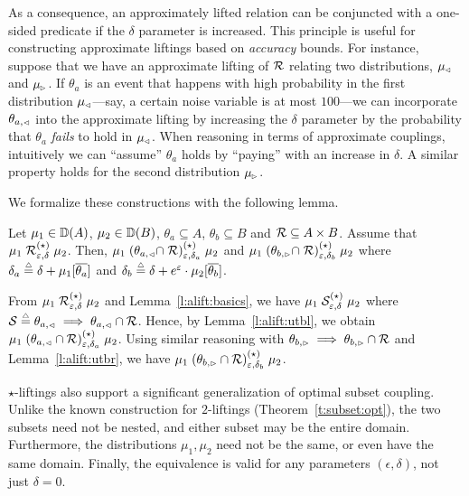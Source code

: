 \documentclass{lmcs}
\begin{document}
As a consequence, an approximately lifted relation can be conjuncted with a
one-sided predicate if the $\delta$ parameter is increased. This principle is
useful for constructing approximate liftings based on \emph{accuracy} bounds.
For instance, suppose that we have an approximate lifting of $\mathcal{R}$ relating two
distributions, $\mu_{\mspace{-1.5mu}{\scriptscriptstyle \vartriangleleft}}$ and $\mu_{\mspace{-1.5mu}{\scriptscriptstyle \vartriangleright}}$. If $\theta_{a}$ is an event that
happens with high probability in the first distribution $\mu_{\mspace{-1.5mu}{\scriptscriptstyle \vartriangleleft}}$---say, a
certain noise variable is at most $100$---we can incorporate $\theta_{a,
{\scriptscriptstyle \vartriangleleft}}$ into the approximate lifting by increasing the $\delta$ parameter by
the probability that $\theta_{a}$ \emph{fails} to hold in $\mu_{\mspace{-1.5mu}{\scriptscriptstyle \vartriangleleft}}$. When
reasoning in terms of approximate couplings, intuitively we can ``assume''
$\theta_{a}$ holds by ``paying'' with an increase in $\delta$. A similar
property holds for the second distribution $\mu_{\mspace{-1.5mu}{\scriptscriptstyle \vartriangleright}}$.

We formalize these constructions with the following lemma.

\begin{lem} \label{l:onesided:and}
  Let $\mu_1 \in {\mathbb{D}}(A)$, $\mu_2 \in {\mathbb{D}}(B)$,
  $\theta_a \subseteq A$, $\theta_b \subseteq B$ and
  $\mathcal{R} \subseteq A \times B$.
  Assume that
  $\mu_1 \mathrel{\mathrel{\mathcal{R}}^{(\star)}_{\varepsilon,\delta}} \mu_2$.
  Then, 
  $\mu_1 \mathrel{(\theta_{a,{\scriptscriptstyle \vartriangleleft}} \cap \mathrel{\mathcal{R}})^{(\star)}_{\varepsilon,\delta_a}} \mu_2$
  and
  $\mu_1 \mathrel{(\theta_{b,{\scriptscriptstyle \vartriangleright}} \cap \mathrel{\mathcal{R}})^{(\star)}_{\varepsilon,\delta_b}} \mu_2$
  where $\delta_a \mathrel{\stackrel{\scriptscriptstyle \triangle}{=}} \delta + \mu_1[\overline{\theta_a}]$ and
  $\delta_b \mathrel{\stackrel{\scriptscriptstyle \triangle}{=}} \delta + e^{\varepsilon} \cdot \mu_2[\overline{\theta_b}]$.
\end{lem}

\proofatend
  From
  $\mu_1 \mathrel{\mathrel{\mathcal{R}}^{(\star)}_{\varepsilon,\delta}} \mu_2$
  and Lemma~\ref{l:alift:basics}, we have
  $\mu_1 \mathrel{\mathrel{\mathcal{S}}^{(\star)}_{\varepsilon,\delta}} \mu_2$
  where
  $\mathcal{S} \mathrel{\stackrel{\scriptscriptstyle \triangle}{=}} \theta_{a,{\scriptscriptstyle \vartriangleleft}} \implies \theta_{a,{\scriptscriptstyle \vartriangleleft}} \cap \mathcal{R}$.
  Hence, by Lemma~\ref{l:alift:utbl}, we obtain
  $\mu_1 \mathrel{(\theta_{a,{\scriptscriptstyle \vartriangleleft}} \cap \mathcal{R})^{(\star)}_{\varepsilon,\delta_a}} \mu_2$.
  Using similar reasoning with
  $\theta_{b,{\scriptscriptstyle \vartriangleright}} \implies \theta_{b,{\scriptscriptstyle \vartriangleright}} \cap \mathcal{R}$
  and Lemma~\ref{l:alift:utbr}, we have
  $\mu_1 \mathrel{(\theta_{b,{\scriptscriptstyle \vartriangleright}} \cap \mathcal{R})^{(\star)}_{\varepsilon,\delta_b}} \mu_2$.
\endproofatend

$\star$-liftings also support a significant generalization of optimal subset
coupling. Unlike the known construction for $2$-liftings
(Theorem~\ref{t:subset:opt}), the two subsets need not be nested, and either
subset may be the entire domain. Furthermore, the distributions $\mu_1, \mu_2$
need not be the same, or even have the same domain. Finally, the equivalence is
valid for any parameters $(\epsilon, \delta)$, not just $\delta = 0$.
\end{document}
